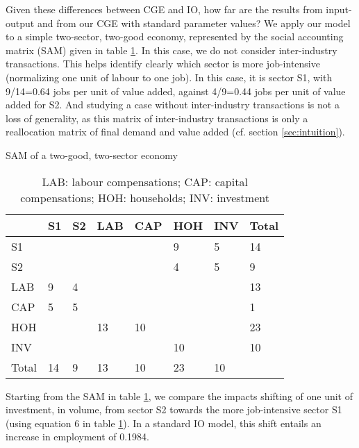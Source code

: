 Given these differences between CGE and IO, how far are the results from input-output and from our CGE with standard parameter values? 
We apply our model to a simple two-sector, two-good economy, represented by the social accounting matrix (SAM) given in table \ref{tab:SAM_2x2}. 
In this case, we do not consider inter-industry transactions. This helps identify clearly which sector is more job-intensive (normalizing one unit of labour to one job). In this case, it is sector S1, with 9/14=0.64 jobs per unit of value added, against 4/9=0.44 jobs per unit of value added for S2. And studying a case without inter-industry transactions is not a loss of generality, as this matrix of inter-industry transactions is only a reallocation matrix of final demand and value added (cf. section \ref{sec:intuition}).

\begin{table}
	\centering
	\caption{SAM of a two-good, two-sector economy}
	\label{tab:SAM_2x2}
	\begin{tabular}{llllllll}
		\toprule
		& S1 & S2 & LAB & CAP & HOH & INV & Total \\
		\midrule
		S1 &  &  &  &  & 9 & 5 & 14 \\
		S2 &  &  &  &  & 4 & 5 & 9 \\
		LAB & 9 & 4 &  &  &  &  & 13 \\
		CAP & 5 & 5 &  &  &  &  & 1 \\
		HOH &  &  & 13 & 10 &  &  & 23 \\
		INV &  &  &  &  & 10 &  & 10 \\
		Total & 14 & 9 & 13 & 10 & 23 & 10 &  \\
		\bottomrule
	\end{tabular}
	\caption*{LAB: labour compensations; CAP: capital compensations; HOH: households; INV: investment}
\end{table}

Starting from the SAM in table \ref{tab:SAM_2x2}, we compare the impacts shifting of one unit of investment, in volume, from sector S2 towards the more job-intensive sector S1 (using equation 6 in table \ref{tab:SAM_2x2}). 
In a standard IO model, this shift entails an increase in employment of 0.1984.

